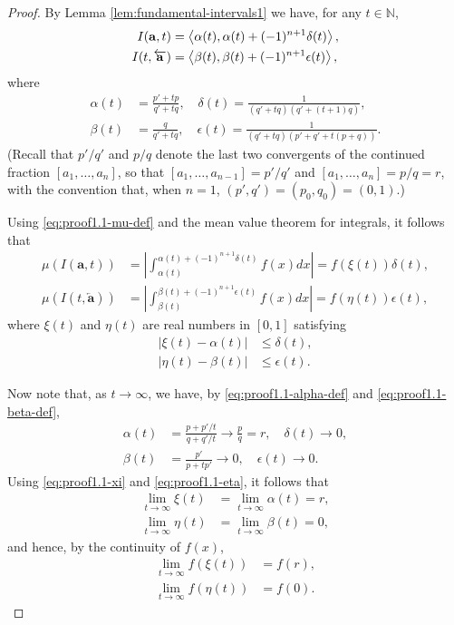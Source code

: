 \documentclass[10pt]{article}
\theoremstyle{definition}
\numberwithin{equation}{section}
\numberwithin{lemma}{section}
\newcommand{\NN}{\mathbb{N}}
\newcommand{\bfa}{\mathbf{a}}
\newcommand{\bfar}{\overleftarrow{\bfa}}
\newcommand{\Fundint}[1]{\left\langle #1\right\rangle}
\begin{document}
\begin{proof}
By Lemma \ref{lem:fundamental-intervals1} we have, for any
$t\in\NN$,
\begin{align}
\notag
I(\bfa,t) &= \Fundint{\alpha(t),\alpha(t)+(-1)^{n+1}\delta(t)},
\\
\notag
I(t,\bfar)&=\Fundint{\beta(t),\beta(t)+(-1)^{n+1}\epsilon(t)},
\end{align}
where 
\begin{align}
\label{eq:proof1.1-alpha-def}
\alpha(t)&=\frac{p'+tp}{q'+tq},
\quad \delta(t)=\frac1{(q'+tq)(q'+(t+1)q)},
\\
\label{eq:proof1.1-beta-def}
\beta(t)&=\frac{q}{q'+tq},
\quad \epsilon(t)=\frac1{(q'+tq)(p'+q'+t(p+q))}.
\end{align}
(Recall that $p'/q'$ and $p/q$ denote the last two convergents of the
continued fraction $[a_1,\dots,a_n]$, so that 
$[a_1,\dots,a_{n-1}]=p'/q'$ and $[a_1,\dots,a_n]=p/q=r$, 
with the convention that, when $n=1$,
$(p',q')=(p_0,q_0)=(0,1)$.)

Using \eqref{eq:proof1.1-mu-def} and the mean value theorem for
integrals, it follows
that
\begin{align}
\label{eq:proof1.1-muIbfat}
\mu(I(\bfa,t))&=\left|\int_{\alpha(t)}^{\alpha(t)+(-1)^{n+1}\delta(t)}
f(x)dx\right| =f(\xi(t))\delta(t),
\\
\label{eq:proof1.1-muItbfar}
\mu(I(t,\bfar))&=\left|\int_{\beta(t)}^{\beta(t)+(-1)^{n+1}\epsilon(t)}
f(x)dx\right| =f(\eta(t))\epsilon(t),
\end{align}
where $\xi(t)$ and $\eta(t)$ are real numbers in $[0,1]$ satisfying
\begin{align}
\label{eq:proof1.1-xi}
|\xi(t)-\alpha(t)|&\le \delta(t),
\\
\label{eq:proof1.1-eta}
|\eta(t)-\beta(t)|&\le \epsilon(t).
\end{align}

Now note that, as $t\to\infty$, we have, by 
\eqref{eq:proof1.1-alpha-def}
and \eqref{eq:proof1.1-beta-def}, 
\begin{align*}
\alpha(t)&= \frac{p+p'/t}{q+q'/t}\to \frac{p}{q}=r,
\quad \delta(t)\to 0,
\\
\beta(t)&=\frac{p'}{p+tp'}\to 0,
\quad \epsilon(t)\to 0.
\end{align*}
Using 
\eqref{eq:proof1.1-xi} and \eqref{eq:proof1.1-eta}, it follows that 
\begin{align*}
\lim_{t\to\infty}\xi(t)&=\lim_{t\to\infty}\alpha(t)=r,
\\
\lim_{t\to\infty}\eta(t)&=\lim_{t\to\infty}\beta(t)=0,
\end{align*}
and hence, by the continuity of $f(x)$,
\begin{align}
\label{eq:proof1.1-fxi-limit}
\lim_{t\to\infty}f(\xi(t))&=f(r),
\\
\label{eq:proof1.1-feta-limit}
\lim_{t\to\infty}f(\eta(t))&=f(0).
\end{align}


\end{proof}
\end{document}

